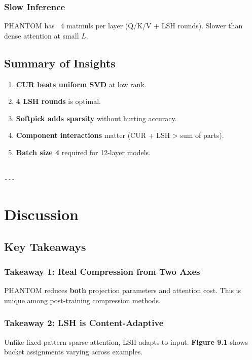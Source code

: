 \subsubsection{Slow Inference}

PHANTOM has ~4 matmuls per layer (Q/K/V + LSH rounds). Slower than dense 
attention at small $L$.

\subsection{Summary of Insights}

\begin{enumerate}
\item \textbf{CUR beats uniform SVD} at low rank.
\item \textbf{4 LSH rounds} is optimal.
\item \textbf{Softpick adds sparsity} without hurting accuracy.
\item \textbf{Component interactions} matter (CUR + LSH > sum of parts).
\item \textbf{Batch size 4} required for 12-layer models.
\end{enumerate}
\begin{lstlisting}

---
\end{lstlisting}


\section{Discussion}

\subsection{Key Takeaways}

\subsubsection{Takeaway 1: Real Compression from Two Axes}

PHANTOM reduces \textbf{both} projection parameters and attention cost. This is 
unique among post-training compression methods.

\subsubsection{Takeaway 2: LSH is Content-Adaptive}

Unlike fixed-pattern sparse attention, LSH adapts to input. \textbf{Figure 9.1} 
shows bucket assignments varying across examples.

